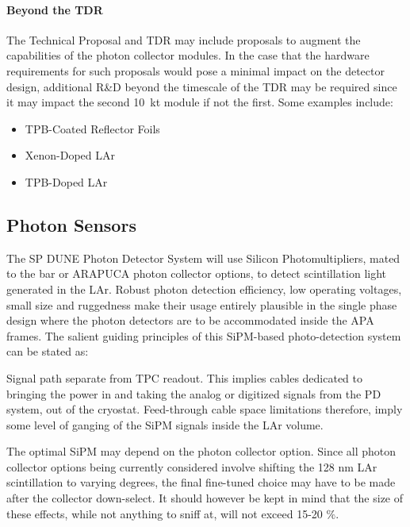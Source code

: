 \paragraph*{Beyond the TDR} The Technical Proposal and TDR may include proposals to augment the capabilities of the photon
collector modules. In the case that the hardware requirements for such proposals would pose a minimal
impact on the detector design, additional R\&D beyond the timescale of the TDR may be required since it may impact the second 10~kt module if not the first. 
Some examples include:
\begin{itemize}
\item TPB-Coated Reflector Foils %
\item Xenon-Doped LAr %
\item TPB-Doped LAr %
\end{itemize}


\subsection{Photon Sensors}
\label{sec:fdsp-pd-ps}

The SP DUNE Photon Detector System will use Silicon Photomultipliers, mated to
the bar or ARAPUCA photon collector options, to detect scintillation light generated in the LAr. Robust photon detection efficiency, low operating voltages, small size and ruggedness make their usage entirely plausible in the single
phase design where the photon detectors are to be accommodated inside the APA 
frames. The salient guiding principles of this SiPM-based photo-detection system can be stated
as:

Signal path separate from TPC readout. This implies cables dedicated to bringing the power
in and taking the analog or digitized signals from the PD system, out of the cryostat. 
Feed-through cable space limitations therefore, imply some level of ganging of the SiPM
signals inside the LAr volume. 

The optimal SiPM may depend on the photon collector option. Since all photon collector
options being currently considered involve shifting the 128 nm LAr scintillation to 
varying degrees, the final fine-tuned choice may have to be made after the collector
down-select. It should however be kept in mind that the size of these effects, while not 
anything to sniff at, will not exceed 15-20 $\%$.

